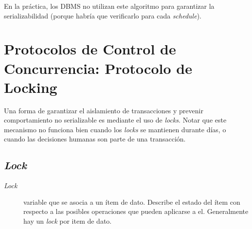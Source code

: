 \documentclass[a4paper, twoside]{article}
\begin{document}
En la práctica, los DBMS no utilizan este algoritmo para garantizar la serializabilidad (porque habría que verificarlo para cada \emph{schedule}).

\section{Protocolos de Control de Concurrencia: Protocolo de Locking}

Una forma de garantizar el aislamiento de transacciones y prevenir comportamiento no serializable es mediante el uso de \emph{locks}. Notar que este mecanismo no funciona bien cuando los \emph{locks} se mantienen durante días, o cuando las decisiones humanas son parte de una transacción.

\subsection{\emph{Lock}}
\begin{description}
	\item[\emph{Lock}] variable que se asocia a un ítem de dato. Describe el estado del ítem con respecto a las posibles operaciones que pueden aplicarse a el. Generalmente hay un \emph{lock} por item de dato.
\end{description}
\end{document}
